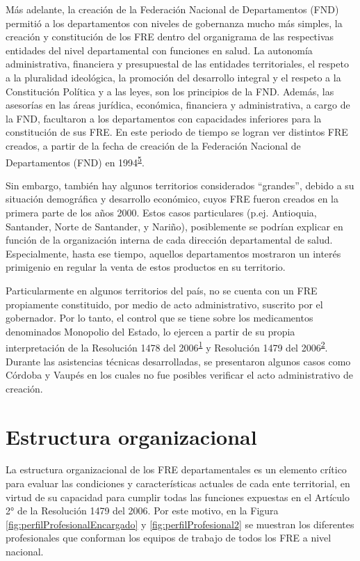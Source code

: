 \documentclass[
]{book}
\begin{document}
Más adelante, la creación de la Federación Nacional de Departamentos (FND) permitió a los departamentos con niveles de gobernanza mucho más simples, la creación y constitución de los FRE dentro del organigrama de las respectivas entidades del nivel departamental con funciones en salud. La autonomía administrativa, financiera y presupuestal de las entidades territoriales, el respeto a la pluralidad ideológica, la promoción del desarrollo integral y el respeto a la Constitución Política y a las leyes, son los principios de la FND. Además, las asesorías en las áreas jurídica, económica, financiera y administrativa, a cargo de la FND, facultaron a los departamentos con capacidades inferiores para la constitución de sus FRE. En este periodo de tiempo se logran ver distintos FRE creados, a partir de la fecha de creación de la Federación Nacional de Departamentos (FND) en 1994\textsuperscript{\protect\hyperlink{ref-FederacionNacionaldeDepartamentos2021}{5}}.

Sin embargo, también hay algunos territorios considerados ``grandes'', debido a su situación demográfica y desarrollo económico, cuyos FRE fueron creados en la primera parte de los años 2000. Estos casos particulares (p.ej. Antioquia, Santander, Norte de Santander, y Nariño), posiblemente se podrían explicar en función de la organización interna de cada dirección departamental de salud. Especialmente, hasta ese tiempo, aquellos departamentos mostraron un interés primigenio en regular la venta de estos productos en su territorio.

Particularmente en algunos territorios del país, no se cuenta con un FRE propiamente constituido, por medio de acto administrativo, suscrito por el gobernador. Por lo tanto, el control que se tiene sobre los medicamentos denominados Monopolio del Estado, lo ejercen a partir de su propia interpretación de la Resolución 1478 del 2006\textsuperscript{\protect\hyperlink{ref-MSPS1478-2006}{1}} y Resolución 1479 del 2006\textsuperscript{\protect\hyperlink{ref-MSPS1479-2006}{2}}. Durante las asistencias técnicas desarrolladas, se presentaron algunos casos como Córdoba y Vaupés en los cuales no fue posibles verificar el acto administrativo de creación.

\hypertarget{estructura-organizacional}{%
\section{Estructura organizacional}\label{estructura-organizacional}}

La estructura organizacional de los FRE departamentales es un elemento crítico para evaluar las condiciones y características actuales de cada ente territorial, en virtud de su capacidad para cumplir todas las funciones expuestas en el Artículo 2° de la Resolución 1479 del 2006. Por este motivo, en la Figura \ref{fig:perfilProfesionalEncargado} y \ref{fig:perfilProfesional2} se muestran los diferentes profesionales que conforman los equipos de trabajo de todos los FRE a nivel nacional.
\end{document}
